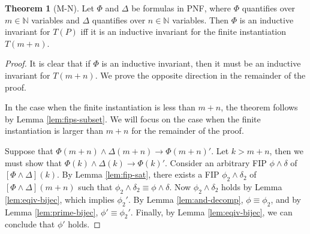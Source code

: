 \documentclass[12pt]{article}
\theoremstyle{definition}
\newtheorem{theorem}{Theorem}
\theoremstyle{remark}
\begin{document}
\begin{theorem}[M-N]
  Let $\Phi$ and $\Delta$ be formulas in PNF, where $\Phi$ quantifies over $m \in \mathbb{N}$ variables and $\Delta$ quantifies over $n \in \mathbb{N}$ variables.  Then $\Phi$ is an inductive invariant for $T(P)$ iff it is an inductive invariant for the finite instantiation $T(m+n)$.
\end{theorem}
\begin{proof}
  It is clear that if $\Phi$ is an inductive invariant, then it must be an inductive invariant for $T(m+n)$.  We prove the opposite direction in the remainder of the proof.

  In the case when the finite instantiation is less than $m+n$, the theorem follows by Lemma \ref{lem:fips-subset}.  We will focus on the case when the finite instantiation is larger than $m+n$ for the remainder of the proof.

  Suppose that $\Phi(m+n) \land \Delta(m+n) \rightarrow \Phi(m+n)'$.  Let $k > m+n$, then we must show that $\Phi(k) \land \Delta(k) \rightarrow \Phi(k)'$.  Consider an arbitrary FIP $\phi\land\delta$ of $[\Phi\land\Delta](k)$.  By Lemma \ref{lem:fip-sat}, there exists a FIP $\phi_2\land\delta_2$ of $[\Phi\land\Delta](m+n)$ such that $\phi_2\land\delta_2 \equiv \phi\land\delta$.  Now $\phi_2\land\delta_2$ holds by Lemma \ref{lem:eqiv-bijec}, which implies $\phi_2'$.  By Lemma \ref{lem:and-decomp}, $\phi \equiv \phi_2$, and by Lemma \ref{lem:prime-bijec}, $\phi' \equiv \phi_2'$.  Finally, by Lemma \ref{lem:eqiv-bijec}, we can conclude that $\phi'$ holds.
\end{proof}
\end{document}
